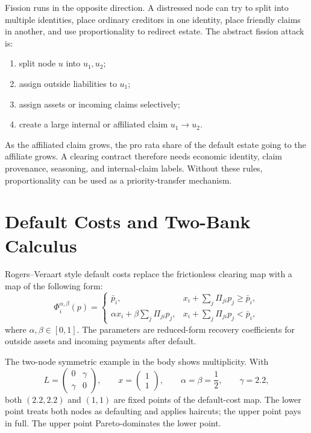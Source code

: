 \documentclass[11pt,oneside]{article}
\newcommand{\barp}{\bar p}
\begin{document}
Fission runs in the opposite direction. A distressed node can try to split into
multiple identities, place ordinary creditors in one identity, place friendly
claims in another, and use proportionality to redirect estate. The abstract
fission attack is:

\begin{enumerate}[leftmargin=1.5em]
  \item split node $u$ into $u_1,u_2$;
  \item assign outside liabilities to $u_1$;
  \item assign assets or incoming claims selectively;
  \item create a large internal or affiliated claim $u_1\to u_2$.
\end{enumerate}

As the affiliated claim grows, the pro rata share of the default estate going
to the affiliate grows. A clearing contract therefore needs economic identity,
claim provenance, seasoning, and internal-claim labels. Without these rules,
proportionality can be used as a priority-transfer mechanism.

\section{Default Costs and Two-Bank Calculus}

Rogers--Veraart style default costs replace the frictionless clearing map with
a map of the following form:
\[
  \Phi_i^{\alpha,\beta}(p)=
  \begin{cases}
    \barp_i, & x_i+\sum_j\Pi_{ji}p_j\geq \barp_i,\\
    \alpha x_i+\beta\sum_j\Pi_{ji}p_j, &
      x_i+\sum_j\Pi_{ji}p_j<\barp_i,
  \end{cases}
\]
where $\alpha,\beta\in[0,1]$. The parameters are reduced-form recovery
coefficients for outside assets and incoming payments after default.

The two-node symmetric example in the body shows multiplicity. With
\[
  L=
  \begin{pmatrix}
    0 & \gamma\\
    \gamma & 0
  \end{pmatrix},
  \qquad
  x=
  \begin{pmatrix}
    1\\
    1
  \end{pmatrix},
  \qquad
  \alpha=\beta=\frac12,
  \qquad
  \gamma=2.2,
\]
both $(2.2,2.2)$ and $(1,1)$ are fixed points of the default-cost map. The
lower point treats both nodes as defaulting and applies haircuts; the upper
point pays in full. The upper point Pareto-dominates the lower point.
\end{document}
